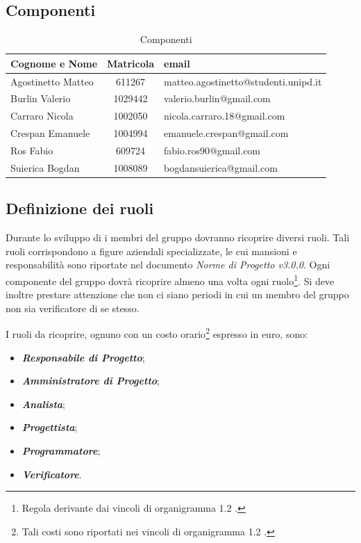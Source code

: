 \subsection{Componenti}

\begin{table}[h]
	\centering
	\begin{tabular}{|l|c|l|}
		\toprule
		\textbf{Cognome e Nome} & \textbf{Matricola} & \textbf{email} \\
	
		\midrule
		Agostinetto Matteo & 611267 & matteo.agostinetto@studenti.unipd.it \\
		Burlin Valerio & 1029442 & valerio.burlin@gmail.com \\ 
		Carraro Nicola & 1002050 & nicola.carraro.18@gmail.com \\
		Crespan Emanuele & 1004994 & emanuele.crespan@gmail.com \\
		Ros Fabio & 609724 & fabio.ros90@gmail.com \\
		Suierica Bogdan & 1008089 & bogdansuierica@gmail.com \\
		
		\bottomrule
	\end{tabular}
	\caption{Componenti}
\end{table}

\subsection{Definizione dei ruoli}
\label{ruoli}
Durante lo sviluppo di \PROGETTO{} i membri del gruppo dovranno ricoprire diversi ruoli. Tali ruoli corrispondono a figure aziendali specializzate, le cui mansioni e responsabilità sono riportate nel documento \textit{Norme di Progetto v3.0.0}. Ogni componente del gruppo dovrà ricoprire almeno una volta ogni ruolo\footnote{Regola derivante dai vincoli di organigramma 1.2 .}. Si deve inoltre prestare attenzione che non ci siano periodi in cui un membro del gruppo non sia verificatore di se stesso.

\noindent I ruoli da ricoprire, ognuno con un costo orario\footnote{Tali costi sono riportati nei vincoli di organigramma 1.2 .} espresso in euro, sono: 
\begin{itemize}
	\item \textbf{\textit{Responsabile di Progetto}};
	\item \textbf{\textit{Amministratore di Progetto}};
	\item \textbf{\textit{Analista}};
	\item \textbf{\textit{Progettista}};
	\item \textbf{\textit{Programmatore}};
	\item \textbf{\textit{Verificatore}}.	
\end{itemize}




